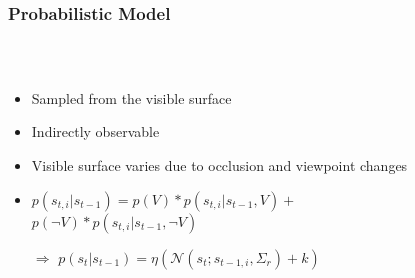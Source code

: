 \begin{frame}
  \frametitle{Probabilistic Model}
  \begin{columns}
  \begin{column}{0.62\textwidth}
  \begin{description}[]
  \item[Surface points] \hfill \\
  \begin{itemize}
  \item Sampled from the visible surface
  \item Indirectly observable
  \item Visible surface varies due to occlusion and viewpoint changes
  \item $p(s_{t,i}|s_{t-1})=p(V)*p(s_{t,i}|s_{t-1},V)+$\\$p(\neg V)*p(s_{t,i}|s_{t-1},\neg V)$
  \item[$\Rightarrow$] $p(s_{t}|s_{t-1}) = \eta(\mathcal{N}(s_t;s_{t-1,i},\Sigma_r) + k)$
  \end{itemize}
  \end{description}
  \end{column}
  \begin{column}{0.4\textwidth}
  \end{column}
  \end{columns}
\end{frame}

